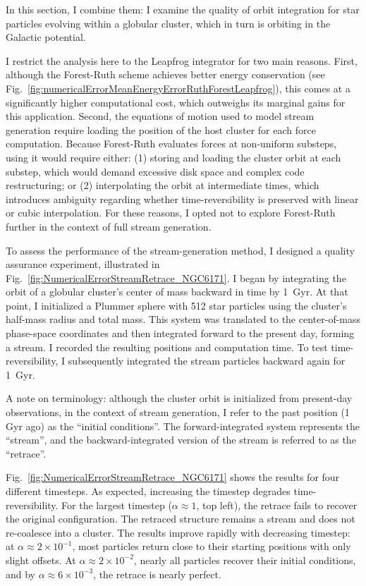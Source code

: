         In this section, I combine them: I examine the quality of orbit integration for star particles evolving within a globular cluster, which in turn is orbiting in the Galactic potential.

        I restrict the analysis here to the Leapfrog integrator for two main reasons. First, although the Forest-Ruth scheme achieves better energy conservation (see Fig.~\ref{fig:numericalErrorMeanEnergyErrorRuthForestLeapfrog}), this comes at a significantly higher computational cost, which outweighs its marginal gains for this application. Second, the equations of motion used to model stream generation require loading the position of the host cluster for each force computation. Because Forest-Ruth evaluates forces at non-uniform substeps, using it would require either: (1) storing and loading the cluster orbit at each substep, which would demand excessive disk space and complex code restructuring; or (2) interpolating the orbit at intermediate times, which introduces ambiguity regarding whether time-reversibility is preserved with linear or cubic interpolation. For these reasons, I opted not to explore Forest-Ruth further in the context of full stream generation.

        To assess the performance of the stream-generation method, I designed a quality assurance experiment, illustrated in Fig.~\ref{fig:NumericalErrorStreamRetrace_NGC6171}. I began by integrating the orbit of a globular cluster's center of mass backward in time by 1~Gyr. At that point, I initialized a Plummer sphere with 512 star particles using the cluster's half-mass radius and total mass. This system was translated to the center-of-mass phase-space coordinates and then integrated forward to the present day, forming a stream. I recorded the resulting positions and computation time. To test time-reversibility, I subsequently integrated the stream particles backward again for 1~Gyr.

        A note on terminology: although the cluster orbit is initialized from present-day observations, in the context of stream generation, I refer to the past position (1 Gyr ago) as the ``initial conditions''. The forward-integrated system represents the ``stream'', and the backward-integrated version of the stream is referred to as the ``retrace''.

        Fig.~\ref{fig:NumericalErrorStreamRetrace_NGC6171} shows the results for four different timesteps. As expected, increasing the timestep degrades time-reversibility. For the largest timestep ($\alpha \approx 1$, top left), the retrace fails to recover the original configuration. The retraced structure remains a stream and does not re-coalesce into a cluster. The results improve rapidly with decreasing timestep: at $\alpha \approx 2 \times 10^{-1}$, most particles return close to their starting positions with only slight offsets. At $\alpha \approx 2 \times 10^{-2}$, nearly all particles recover their initial conditions, and by $\alpha \approx 6 \times 10^{-3}$, the retrace is nearly perfect.

